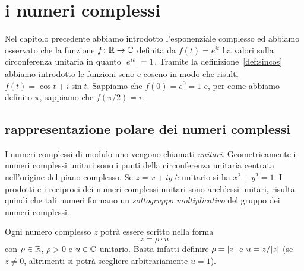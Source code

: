 \chapter{i numeri complessi}

Nel capitolo precedente abbiamo introdotto l'esponenziale complesso ed
abbiamo osservato che la funzione $f\colon {\mathbb R} \to {\mathbb C}$ definita da
$f(t) = e^{it}$ ha valori sulla circonferenza unitaria in quanto
${\left|e^{it}\right|}=1$. Tramite la definizione~\ref{def:sincos}
abbiamo introdotto le funzioni seno e coseno in
modo che risulti $f(t) = \cos t + i \sin t$.
Sappiamo che $f(0) = e^0 = 1$ e, per come abbiamo definito $\pi$,
sappiamo che $f(\pi/2) = i$.

\section{rappresentazione polare dei numeri complessi}

I numeri complessi di modulo uno vengono chiamati \emph{unitari}.
%
%
%
Geometricamente i numeri complessi unitari sono i punti della circonferenza
unitaria centrata nell'origine del piano complesso.
Se $z=x+iy$ è unitario si ha $x^2+y^2=1$.
I prodotti e i
reciproci dei numeri complessi unitari sono anch'essi unitari,
risulta quindi che tali numeri formano un \emph{sottogruppo moltiplicativo}%
del gruppo dei numeri complessi.

Ogni numero complesso $z$ potrà essere scritto nella forma
\[
  z = \rho \cdot u
\]
con $\rho\in {\mathbb R}$, $\rho>0$ e $u\in{\mathbb C}$ unitario.
Basta infatti
definire $\rho = {\left|z\right|}$ e $u = z / {\left|z\right|}$ (se $z\neq 0$, altrimenti
si potrà scegliere arbitrariamente $u=1$).

